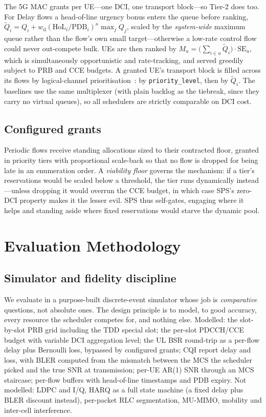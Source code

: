 \documentclass[conference]{IEEEtran}
\begin{document}
The 5G MAC grants per UE---one DCI, one transport block---so Tier-2 does
too. For Delay flows a head-of-line urgency bonus enters the queue before
ranking,
$\tilde{Q}_i = Q_i + w_\mathrm{d}(\mathrm{HoL}_i/\mathrm{PDB}_i)^{\kappa}\max_j Q_j$,
scaled by the \emph{system-wide} maximum queue rather than the flow's own
small target---otherwise a low-rate control flow could never out-compete
bulk. UEs are then ranked by
$M_u = \big(\sum_{i\in u} \tilde{Q}_i\big)\cdot \mathrm{SE}_u$, which is
simultaneously opportunistic and rate-tracking, and served greedily subject
to PRB and CCE budgets. A granted UE's transport block is filled across its
flows by logical-channel prioritisation~\cite{ts38321}: by
\texttt{priority\_level}, then by $\tilde{Q}_i$. The baselines use the same multiplexer (with plain
backlog as the tiebreak, since they carry no virtual queues), so all
schedulers are strictly comparable on DCI cost.

\subsection{Configured grants}
Periodic flows receive standing allocations sized to their contracted
floor, granted in priority tiers with proportional scale-back so that no
flow is dropped for being late in an enumeration order. A \emph{viability
floor} governs the mechanism: if a tier's reservations would be scaled
below a threshold, the tier runs dynamically instead---unless dropping it
would overrun the CCE budget, in which case SPS's zero-DCI property makes
it the lesser evil. SPS thus self-gates, engaging where it helps and
standing aside where fixed reservations would starve the dynamic pool.

\section{Evaluation Methodology}\label{sec:method}

\subsection{Simulator and fidelity discipline}
We evaluate in a purpose-built discrete-event simulator whose job is
\emph{comparative} questions, not absolute ones. The design principle is to
model, to good accuracy, every resource the scheduler competes for, and
nothing else. Modelled: the slot-by-slot PRB grid including the TDD special
slot; the per-slot PDCCH/CCE budget with variable DCI aggregation level;
the UL BSR round-trip as a per-flow delay plus Bernoulli loss, bypassed by
configured grants; CQI report delay and loss, with BLER computed from the
mismatch between the MCS the scheduler picked and the true SNR at
transmission; per-UE AR(1) SNR through an MCS staircase; per-flow buffers
with head-of-line timestamps and PDB expiry. Not modelled: LDPC and I/Q,
HARQ as a full state machine (a fixed delay plus BLER discount instead),
per-packet RLC segmentation, MU-MIMO, mobility and inter-cell interference.
\end{document}

